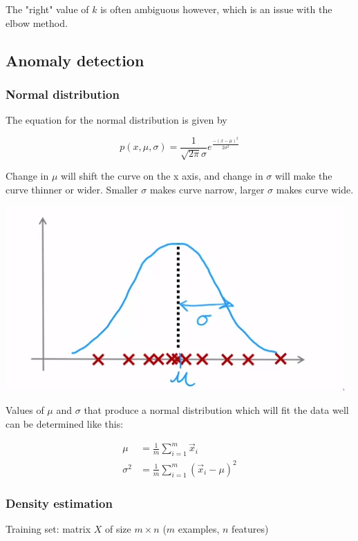 \documentclass[12pt]{article}
\begin{document}
The "right" value of $k$ is often ambiguous however, which is an issue with the elbow method.

\subsection{Anomaly detection}

\subsubsection{Normal distribution}

The equation for the normal distribution is given by

\[ p(x,\mu,\sigma) = \frac{1}{\sqrt{2\pi}\sigma} e^{\frac{-(x - \mu)^2}{2\sigma^2}} \]

Change in $\mu$ will shift the curve on the x axis, and change in $\sigma$ will make the curve
thinner or wider. Smaller $\sigma$ makes curve narrow, larger $\sigma$ makes curve wide.

\includegraphics{images/normal-distribution.png}

Values of $\mu$ and $\sigma$ that produce a normal distribution which will fit the data well can be determined
like this:

\begin{align*}
    \mu &= \frac{1}{m} \sum_{i=1}^m \vec{x}_i\\
    \sigma^2 &= \frac{1}{m} \sum_{i=1}^m (\vec{x}_i - \mu)^2
\end{align*}

\subsubsection{Density estimation}

Training set: matrix $X$ of size $m \times n$ ($m$ examples, $n$ features)
\end{document}
